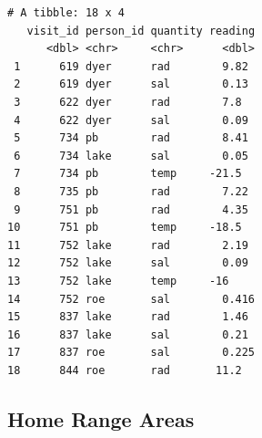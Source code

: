 \begin{enumerate}
\begin{lstlisting}
# A tibble: 18 x 4
   visit_id person_id quantity reading
      <dbl> <chr>     <chr>      <dbl>
 1      619 dyer      rad        9.82 
 2      619 dyer      sal        0.13 
 3      622 dyer      rad        7.8  
 4      622 dyer      sal        0.09 
 5      734 pb        rad        8.41 
 6      734 lake      sal        0.05 
 7      734 pb        temp     -21.5  
 8      735 pb        rad        7.22 
 9      751 pb        rad        4.35 
10      751 pb        temp     -18.5  
11      752 lake      rad        2.19 
12      752 lake      sal        0.09 
13      752 lake      temp     -16    
14      752 roe       sal        0.416
15      837 lake      rad        1.46 
16      837 lake      sal        0.21 
17      837 roe       sal        0.225
18      844 roe       rad       11.2  
\end{lstlisting}

\end{enumerate}

\subsection*{Home Range Areas}

